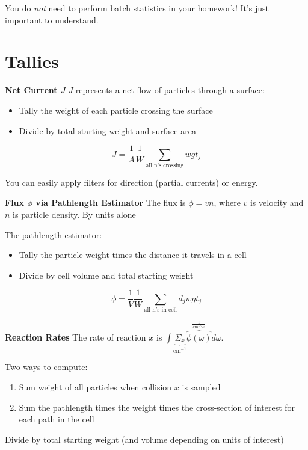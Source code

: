 \textcolor{mitred}{You do \emph{not} need to perform batch statistics
in your homework!  It's just important to understand.}
   
\section*{Tallies}

\textbf{Net Current  $J$}
   $J$ represents a net flow of particles through a surface:
   \begin{itemize}
       \item Tally the weight of each particle crossing the surface
       \item Divide by total \textcolor{mitred}{starting weight} and 
             surface area
   \end{itemize}
   \begin{equation*}
        J = \frac{1}{A}\frac{1}{W} \sum_{\text{all n's crossing}} wgt_{j}
   \end{equation*}

   You can easily apply filters for direction (partial currents) or energy.
   
   
\textbf{Flux $\phi$ via Pathlength Estimator}
   The flux is $\phi = vn$, where $v$ is velocity and $n$ is particle 
   density.  By units alone 
   \begin{center}
   \end{center}
 
  The \textcolor{mitred}{pathlength estimator}:
   \begin{itemize}
      \item Tally the particle weight times the distance it travels in a cell
      \item Divide by cell volume and total starting weight
   \end{itemize}
   \begin{equation*}
        \phi = \frac{1}{V}\frac{1}{W} \sum_{\text{all n's in cell}} d_{j}wgt_{j}
   \end{equation*}   
   
\textbf{Reaction Rates}
  The rate of reaction $x$ is 
  $\int{ \underbrace{\Sigma_{x}}_{\text{cm}^{-1}} 
         \overbrace{\phi(\omega)}^{\frac{1}{\text{cm}^{-2}\text{-s}}} d \omega}$.
 
  Two ways to compute:
  \begin{enumerate}
    \item Sum weight of all particles when collision $x$ is sampled
    \item Sum the pathlength times 
          the weight times the cross-section of interest for each path in the cell
  \end{enumerate}
  Divide by total starting weight (and volume depending on units of interest)
 
